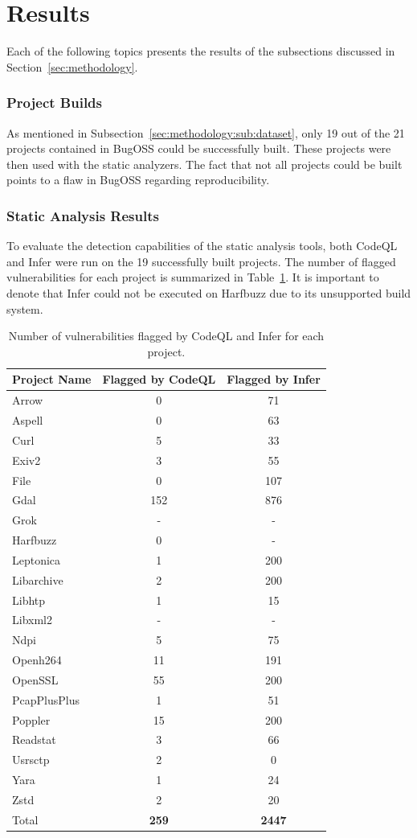 \section{Results}
\label{sec:results}
Each of the following topics presents the results of the subsections discussed in Section~\ref{sec:methodology}.

\subsubsection{Project Builds}
As mentioned in Subsection~\ref{sec:methodology:sub:dataset}, only 19 out of the 21 projects contained in BugOSS could be successfully built. These projects were then used with the static analyzers. The fact that not all projects could be built points to a flaw in BugOSS regarding reproducibility.

\subsubsection{Static Analysis Results}
To evaluate the detection capabilities of the static analysis tools, both CodeQL and Infer were run on the 19 successfully built projects. The number of flagged vulnerabilities for each project is summarized in Table~\ref{sast_results}. It is important to denote that Infer could not be executed on Harfbuzz due to its unsupported build system.

\begin{table}[ht]
\centering
\caption{Number of vulnerabilities flagged by CodeQL and Infer for each project.}
\label{sast_results}
\begin{tabular}{|l|c|c|}
\hline
\textbf{Project Name} & \textbf{Flagged by CodeQL} & \textbf{Flagged by Infer} \\
\hline
Arrow & 0 & 71 \\
Aspell & 0 & 63 \\
Curl & 5 & 33 \\
Exiv2 & 3 & 55 \\
File & 0 & 107 \\
Gdal & 152 & 876 \\
Grok & - & - \\
Harfbuzz & 0 & - \\
Leptonica & 1 & 200 \\
Libarchive & 2 & 200 \\
Libhtp & 1 & 15 \\
Libxml2 & - & - \\
Ndpi & 5 & 75 \\
Openh264 & 11 & 191 \\
OpenSSL & 55 & 200 \\
PcapPlusPlus & 1 & 51 \\
Poppler & 15 & 200 \\
Readstat & 3 & 66 \\
Usrsctp & 2 & 0 \\
Yara & 1 & 24 \\
Zstd & 2 & 20 \\
\hline
Total & \textbf{259} & \textbf{2447} \\
\hline
\end{tabular}
\end{table}

